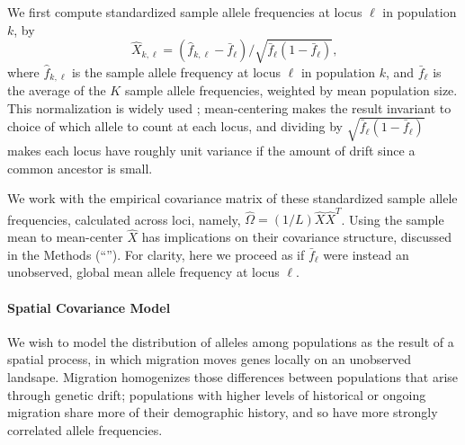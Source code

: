 \documentclass[10pt,letterpaper]{article}
\newcommand{\secref}[1]{``\nameref{#1}''}
\begin{document}
We first compute standardized sample allele frequencies at locus $\ell$ in population $k$, by
\begin{equation}
  \label{eq:standardized_sample_freqs}
  \hat{X}_{k,\ell} = (\hat{f}_{k,\ell}  - \bar{f}_{\ell})/\sqrt{\bar{f}_{\ell}(1-\bar{f}_{\ell})}\text{,}
\end{equation}
where $\hat{f}_{k,\ell}$ is the sample allele frequency at locus $\ell$ in population $k$, 
and $\bar{f}_{\ell}$ is the average of the $K$ sample allele frequencies,
weighted by mean population size.
This normalization is widely used \cite{nicholson2002,Patterson2006};
mean-centering makes the result invariant to choice of which allele to count at each locus,
and dividing by $\sqrt{\bar{f}_{\ell}(1-\bar{f}_{\ell})}$ makes each locus have roughly unit variance
if the amount of drift since a common ancestor is small.

We work with the empirical covariance matrix of these standardized sample allele frequencies,
calculated across loci, namely, $\widehat{\Omega} = (1/L)  \hat{X}\hat{X}^T$.
Using the sample mean to mean-center $\hat X$ has implications on their covariance structure, discussed in the Methods 
(\secref{ss:cov_methods}).
For clarity, here we proceed as if $\bar{f}_{\ell}$ were instead an unobserved, global mean allele frequency at locus $\ell$.

\paragraph{Spatial Covariance Model}
We wish to model the distribution of alleles among populations as the result of a spatial process, 
in which migration moves genes locally on an unobserved landsape.
Migration homogenizes those differences between populations that arise through genetic drift;
populations with higher levels of historical or ongoing migration share more of their demographic history,
and so have more strongly correlated allele frequencies.
\end{document}
